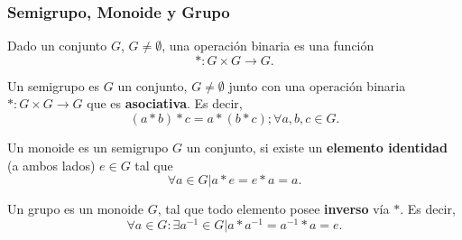 \begin{frame}
    \frametitle{Semigrupo, Monoide y Grupo}
        Dado un conjunto $G$, $G\not = \emptyset$, una operación binaria
        es una función $$\ast : G \times G \to G.$$
    
        Un semigrupo es $G$ un conjunto, $G\not = \emptyset$ junto con una operación 
        binaria $\ast : G \times G \to G$ que es \textbf{asociativa}. Es decir,
        $$(a \ast b) \ast c = a \ast (b \ast c); \forall a, b, c \in G.$$
    
        Un monoide es un semigrupo $G$ un conjunto, si existe un \textbf{elemento identidad}
        (a ambos lados) $e \in G$ tal que $$\forall a \in G | a \ast e = e \ast a = a.$$
    
        Un grupo es un monoide $G$, tal que todo elemento posee \textbf{inverso} vía $\ast$.
        Es decir, $$\forall a \in G : \exists a^{-1} \in G | a \ast a^{-1} = a^{-1} \ast a = e.$$
\end{frame}